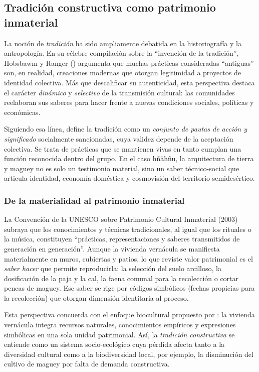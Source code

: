 \subsection{Tradición constructiva como patrimonio inmaterial}
\label{subsec:tradicion_constructiva}

La noción de \emph{tradición} ha sido ampliamente debatida en la
historiografía y la antropología.  En su célebre compilación sobre la
``invención de la tradición'', Hobsbawm y Ranger (\citeyear{hobsbawm1983inventar})
argumenta que muchas prácticas consideradas “antiguas” son, en realidad,
creaciones modernas que otorgan legitimidad a proyectos de identidad
colectiva.  Más que descalificar su autenticidad, esta perspectiva
destaca el carácter \emph{dinámico} y \emph{selectivo} de la
transmisión cultural: las comunidades reelaboran sus saberes para hacer
frente a nuevas condiciones sociales, políticas y económicas.

Siguiendo esa línea, \citeauthor{herrejon1994} define la tradición como
un \emph{conjunto de pautas de acción y significado}
socialmente sancionadas, cuya validez depende de la aceptación
colectiva.\citep{herrejon1994}  Se trata de prácticas que se
mantienen vivas en tanto cumplan una función reconocida dentro del
grupo.  En el caso hñähñu, la arquitectura de tierra y maguey no es
solo un testimonio material, sino un saber técnico-social que articula
identidad, economía doméstica y cosmovisión del territorio
semidesértico.

\subsubsection{De la materialidad al patrimonio inmaterial}

La Convención de la UNESCO sobre Patrimonio Cultural Inmaterial (2003)
subraya que los conocimientos y técnicas
tradicionales, al igual que los rituales o la música, constituyen
``prácticas, representaciones y saberes transmitidos de
generación en generación''.  Aunque la vivienda vernácula se manifiesta
materialmente en muros, cubiertas y patios, lo que reviste valor
patrimonial es el \emph{saber hacer} que permite reproducirla: la
selección del suelo arcilloso, la dosificación de la paja y la cal, la
faena comunal para la recolección o cortar pencas de maguey. Ese saber
se rige por códigos simbólicos (fechas propicias
para la recolección) que otorgan dimensión identitaria al proceso.

Esta perspectiva concuerda con el enfoque biocultural propuesto por
\cite{chang2010patrimonio}: la vivienda
vernácula integra recursos naturales, conocimientos empíricos y
expresiones simbólicas en una sola unidad patrimonial.  Así, la
\emph{tradición constructiva} se entiende como un sistema
socio-ecológico cuya pérdida afecta tanto a la diversidad cultural como
a la biodiversidad local, por ejemplo, la disminución del cultivo de
maguey por falta de demanda constructiva.


